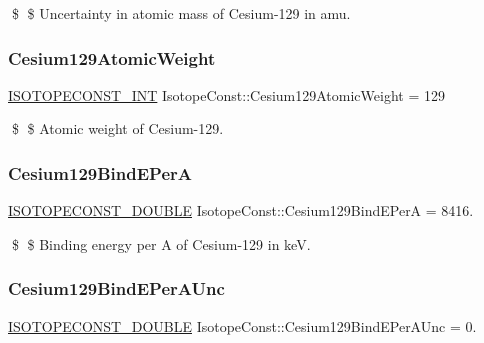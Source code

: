 \$ \$ Uncertainty in atomic mass of Cesium-\/129 in amu. \mbox{\label{group___isotope_const-_cesium-_cs129_ga2947ad4ef8bdc54a9989e10d9d321c0c}} 
\subsubsection{\texorpdfstring{Cesium129\+Atomic\+Weight}{Cesium129AtomicWeight}}
{\footnotesize\ttfamily \mbox{\hyperlink{group___isotope_const-_macros_ga5f18360b3e99483a35c32d789e62621c}{I\+S\+O\+T\+O\+P\+E\+C\+O\+N\+S\+T\+\_\+\+I\+NT}} Isotope\+Const\+::\+Cesium129\+Atomic\+Weight = 129}

\$ \$ Atomic weight of Cesium-\/129. \mbox{\label{group___isotope_const-_cesium-_cs129_ga38ded6beb6db6a27b0e47b3acc79e76d}} 
\subsubsection{\texorpdfstring{Cesium129\+Bind\+E\+PerA}{Cesium129BindEPerA}}
{\footnotesize\ttfamily \mbox{\hyperlink{group___isotope_const-_macros_ga8f45a7272ce02c0b4c65c44636ed719a}{I\+S\+O\+T\+O\+P\+E\+C\+O\+N\+S\+T\+\_\+\+D\+O\+U\+B\+LE}} Isotope\+Const\+::\+Cesium129\+Bind\+E\+PerA = 8416.}

\$ \$ Binding energy per A of Cesium-\/129 in keV. \mbox{\label{group___isotope_const-_cesium-_cs129_gadf67acb97d81844b9ae5df913897cf7b}} 
\subsubsection{\texorpdfstring{Cesium129\+Bind\+E\+Per\+A\+Unc}{Cesium129BindEPerAUnc}}
{\footnotesize\ttfamily \mbox{\hyperlink{group___isotope_const-_macros_ga8f45a7272ce02c0b4c65c44636ed719a}{I\+S\+O\+T\+O\+P\+E\+C\+O\+N\+S\+T\+\_\+\+D\+O\+U\+B\+LE}} Isotope\+Const\+::\+Cesium129\+Bind\+E\+Per\+A\+Unc = 0.}

